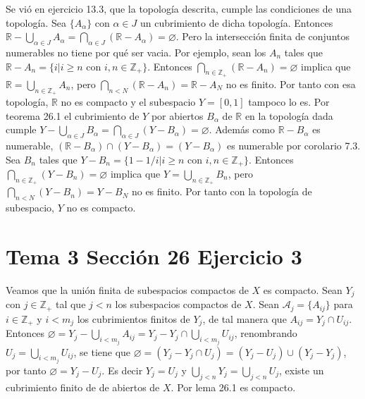 \documentclass{article}
\begin{document}
Se vió en ejercicio 13.3, que la topología descrita, cumple las condiciones de una topología. Sea $\{A_\alpha\}$ con $\alpha\in J$ un cubrimiento de dicha topología. Entonces $\mathbb{R}-\bigcup_{\alpha\in J}A_\alpha=\bigcap_{\alpha\in J}\left(\mathbb{R}-A_\alpha\right)=\varnothing$. Pero la intersección finita de conjuntos numerables no tiene por qué ser vacia. Por ejemplo, sean los $A_n$ tales que $\mathbb{R}-A_n=\{i| i \geq n \text{ con } i,n\in \mathbb{Z}_+\}$. Entonces $\bigcap_{n\in \mathbb{Z}_+}\left(\mathbb{R}-A_n\right)=\varnothing$ implica que $\mathbb{R}=\bigcup_{n\in \mathbb{Z}_+}A_n$, pero $\bigcap_{n< N}\left(\mathbb{R}-A_n\right)=\mathbb{R}-A_N$ no es finito. Por tanto con esa topología, $\mathbb{R}$ no es compacto y el subespacio $Y=[0,1]$ tampoco lo es. Por teorema 26.1 el cubrimiento de $Y$ por abiertos $B_\alpha$ de $\mathbb{R}$ en la topología dada cumple $Y-\bigcup_{\alpha\in J}B_\alpha=\bigcap_{\alpha\in J}\left(Y-B_\alpha\right)=\varnothing$. Además como $\mathbb{R}-B_\alpha$ es numerable, $\left(\mathbb{R}-B_\alpha\right)\cap \left(Y-B_\alpha\right)=\left(Y-B_\alpha\right)$ es numerable por corolario 7.3. Sea $B_n$ tales que $Y-B_n=\{1-1/i| i \geq n \text{ con } i,n\in \mathbb{Z}_+\}$. Entonces $\bigcap_{n\in \mathbb{Z}_+}\left(Y-B_n\right)=\varnothing$ implica que $Y=\bigcup_{n\in \mathbb{Z}_+}B_n$, pero $\bigcap_{n< N}\left(Y-B_n\right)=Y-B_N$ no es finito. Por tanto con la topología de subespacio, $Y$ no es compacto.
\section{Tema 3 Sección 26 Ejercicio 3}
Veamos que la unión finita de subespacios compactos de $X$ es compacto. Sean $Y_j$ con $j\in \mathbb{Z}_+$ tal que $j<n$ los subespacios compactos de $X$. Sean $\mathcal{A}_j=\{A_{ij}\}$ para $i\in \mathbb{Z}_+$ y $i<m_j$ los cubrimientos finitos de $Y_j$, de tal manera que $A_{ij}=Y_j\cap U_{ij}$. Entonces $\varnothing =Y_j-\bigcup_{i<m_j}A_{ij}=Y_j-Y_j\cap\bigcup_{i<m_j}U_{ij}$, renombrando $U_j=\bigcup_{i<m_j}U_{ij}$, se tiene que $\varnothing=\left(Y_j-Y_j\cap U_{j}\right)=\left(Y_j- U_j\right)\cup\left(Y_j-Y_j\right)$, por tanto $\varnothing=Y_j-U_j$. Es decir $Y_j=U_j$ y $\bigcup_{j<n}Y_j= \bigcup_{j<n}U_j$, existe un cubrimiento finito de de abiertos de $X$. Por lema 26.1 es compacto.
\end{document}
